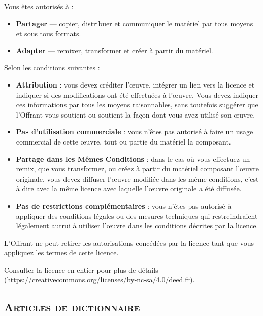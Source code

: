 \documentclass{article}
\begin{document}
\medskip

Vous êtes autorisés à :

\begin{itemize}
	\item \textbf{Partager} --- copier, distribuer et communiquer le matériel par tous moyens et sous tous formats.
	\item \textbf{Adapter} --- remixer, transformer et créer à partir du matériel.
\end{itemize}

\bigskip

Selon les conditions suivantes :

\begin{itemize}
	\item \textbf{Attribution} : vous devez créditer l'\oe{}uvre, intégrer un lien vers la licence et indiquer si des modifications ont été effectuées à l'\oe{}uvre. Vous devez indiquer ces informations par tous les moyens raisonnables, sans toutefois suggérer que l'Offrant vous soutient ou soutient la façon dont vous avez utilisé son \oe{}uvre. 
	\item \textbf{Pas d'utilisation commerciale} : vous n'êtes pas autorisé à faire un usage commercial de cette \oe{}uvre, tout ou partie du matériel la composant. 
	\item \textbf{Partage dans les Mêmes Conditions} : dans le cas où vous effectuez un remix, que vous transformez, ou créez à partir du matériel composant l'\oe{}uvre originale, vous devez diffuser l'\oe{}uvre modifiée dans les même conditions, c'est à dire avec la même licence avec laquelle l'\oe{}uvre originale a été diffusée.
	\item \textbf{Pas de restrictions complémentaires} : vous n'êtes pas autorisé à appliquer des conditions légales ou des mesures techniques qui restreindraient légalement autrui à utiliser l'\oe{}uvre dans les conditions décrites par la licence. 
\end{itemize}

\bigskip

L'Offrant ne peut retirer les autorisations concédées par la licence tant que vous appliquez les termes de cette licence.

\bigskip

Consulter la licence en entier pour plus de détails (\url{https://creativecommons.org/licenses/by-nc-sa/4.0/deed.fr}).



\newpage

\nocite{*}

\begin{center}
	\section*{\textsc{Articles de dictionnaire}}
\end{center}

\bigskip

\printbibheading[heading=none]
\bibbycategory

\end{document}
